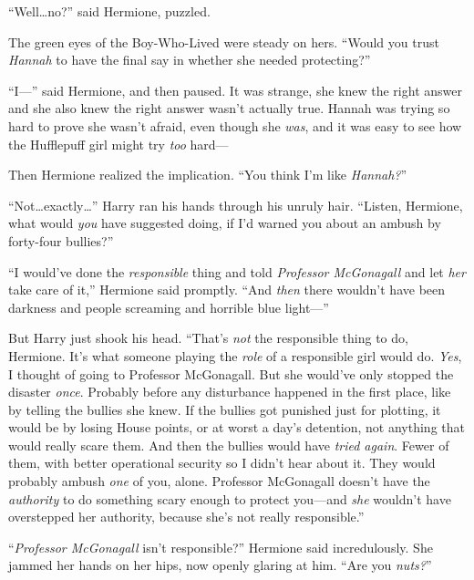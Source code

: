 “Well…no?” said Hermione, puzzled.

The green eyes of the Boy-Who-Lived were steady on hers. “Would you trust \emph{Hannah} to have the final say in whether she needed protecting?”

“I—” said Hermione, and then paused. It was strange, she knew the right answer and she also knew the right answer wasn’t actually true. Hannah was trying so hard to prove she wasn’t afraid, even though she \emph{was}, and it was easy to see how the Hufflepuff girl might try \emph{too} hard—

Then Hermione realized the implication. “You think I’m like \emph{Hannah?}”

“Not…exactly…” Harry ran his hands through his unruly hair. “Listen, Hermione, what would \emph{you} have suggested doing, if I’d warned you about an ambush by forty-four bullies?”

“I would’ve done the \emph{responsible} thing and told \emph{Professor McGonagall} and let \emph{her} take care of it,” Hermione said promptly. “And \emph{then} there wouldn’t have been darkness and people screaming and horrible blue light—”

But Harry just shook his head. “That’s \emph{not} the responsible thing to do, Hermione. It’s what someone playing the \emph{role} of a responsible girl would do. \emph{Yes}, I thought of going to Professor McGonagall. But she would’ve only stopped the disaster \emph{once}. Probably before any disturbance happened in the first place, like by telling the bullies she knew. If the bullies got punished just for plotting, it would be by losing House points, or at worst a day’s detention, not anything that would really scare them. And then the bullies would have \emph{tried again}. Fewer of them, with better operational security so I didn’t hear about it. They would probably ambush \emph{one} of you, alone. Professor McGonagall doesn’t have the \emph{authority} to do something scary enough to protect you—and \emph{she} wouldn’t have overstepped her authority, because she’s not really responsible.”

“\emph{Professor McGonagall} isn’t responsible?” Hermione said incredulously. She jammed her hands on her hips, now openly glaring at him. “Are you \emph{nuts?}”

